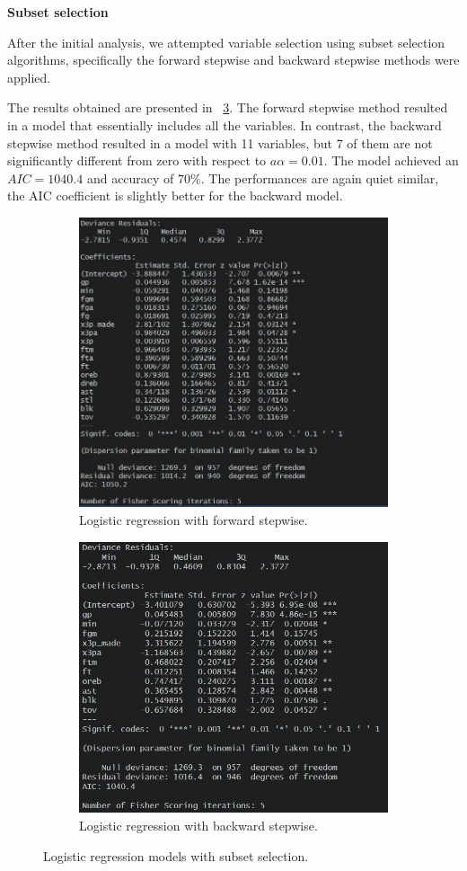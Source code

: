 \vspace{0.2cm}
\textbf{Subset selection}

After the initial analysis, we attempted variable selection using subset selection algorithms, specifically the forward stepwise and backward stepwise methods were applied. 

The results obtained are presented in \Fig~\ref{fig:LRSSSum}. The forward stepwise method resulted in a model that essentially includes all the variables. In contrast, the backward stepwise method resulted in a model with 11 variables, but 7 of them are not significantly different from zero with respect to $a\alpha = 0.01$. The model achieved an $AIC = 1040.4$ and accuracy of $70\%$. The performances are again quiet similar, the AIC coefficient is slightly better for the backward model.

\begin{figure}[h]
	\begin{subfigure}{.6\textwidth}
		\centering
		\includegraphics[width=0.7\linewidth]{ImageFiles/Classification/LogReg/lr_fss_summary}
		\caption{Logistic regression with forward stepwise.}
		\label{fig:LRFSSSum}
	\end{subfigure}
	\begin{subfigure}{.6\textwidth}
		\centering
		\includegraphics[width=0.7\linewidth]{ImageFiles/Classification/LogReg/lr_bss_summary}
		\caption{Logistic regression with backward stepwise.}
		\label{fig:LRBSSSum}
	\end{subfigure}
	\caption{Logistic regression models with subset selection.}
	\label{fig:LRSSSum}
\end{figure}

